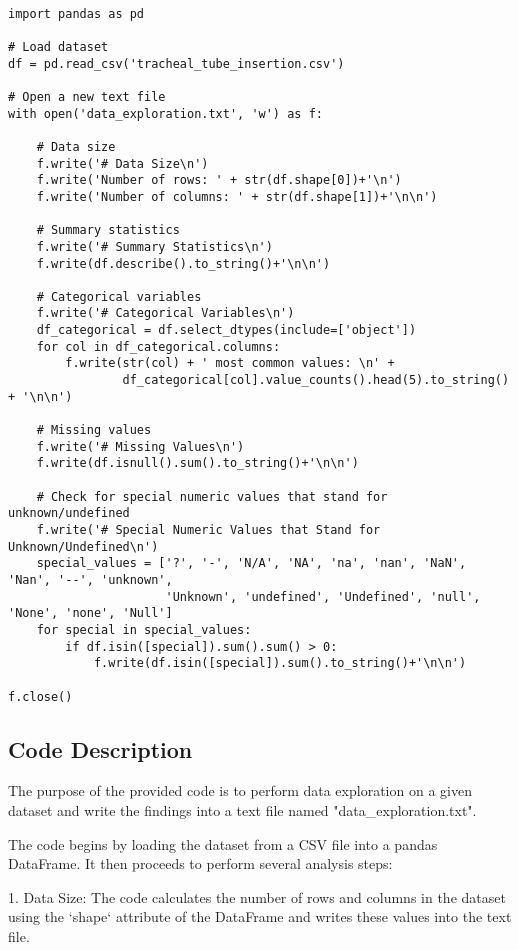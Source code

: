 \documentclass[11pt]{article}
\begin{document}
\begin{verbatim}

import pandas as pd

# Load dataset
df = pd.read_csv('tracheal_tube_insertion.csv')

# Open a new text file
with open('data_exploration.txt', 'w') as f:

    # Data size
    f.write('# Data Size\n')
    f.write('Number of rows: ' + str(df.shape[0])+'\n')
    f.write('Number of columns: ' + str(df.shape[1])+'\n\n')

    # Summary statistics
    f.write('# Summary Statistics\n')
    f.write(df.describe().to_string()+'\n\n')

    # Categorical variables
    f.write('# Categorical Variables\n')
    df_categorical = df.select_dtypes(include=['object'])
    for col in df_categorical.columns:
        f.write(str(col) + ' most common values: \n' + 
                df_categorical[col].value_counts().head(5).to_string() + '\n\n')

    # Missing values
    f.write('# Missing Values\n')
    f.write(df.isnull().sum().to_string()+'\n\n')

    # Check for special numeric values that stand for unknown/undefined
    f.write('# Special Numeric Values that Stand for Unknown/Undefined\n')
    special_values = ['?', '-', 'N/A', 'NA', 'na', 'nan', 'NaN', 'Nan', '--', 'unknown',
                      'Unknown', 'undefined', 'Undefined', 'null', 'None', 'none', 'Null']
    for special in special_values:
        if df.isin([special]).sum().sum() > 0:
            f.write(df.isin([special]).sum().to_string()+'\n\n')

f.close()

\end{verbatim}

\subsection{Code Description}

The purpose of the provided code is to perform data exploration on a given dataset and write the findings into a text file named "data\_exploration.txt".

The code begins by loading the dataset from a CSV file into a pandas DataFrame. It then proceeds to perform several analysis steps:

1. Data Size: The code calculates the number of rows and columns in the dataset using the `shape` attribute of the DataFrame and writes these values into the text file.
\end{document}
